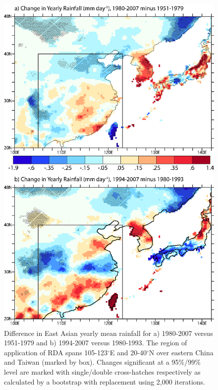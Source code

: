 \documentclass[singlecolumn,11pt]{pnas-new}
\begin{document}
\begin{figure}
\centering
\noindent\includegraphics[width=32pc]{Figures/SFND}
\caption{Difference in East Asian yearly mean rainfall for a) 1980-2007 versus 1951-1979 and  b) 1994-2007 versus 1980-1993. The region of application of RDA spans 105-123$^{\circ}$E and 20-40$^{\circ}$N over eastern China and Taiwan (marked by box). Changes significant at a 95\%/99\% level are marked with single/double cross-hatches respectively as calculated by a bootstrap with replacement using 2,000 iterations.}
\label{fig:sfnd}
\end{figure}

\clearpage

\pnasbreak


\end{document}
